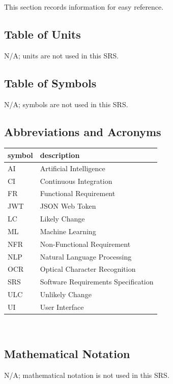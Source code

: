 \documentclass[12pt]{article}
\begin{document}
This section records information for easy reference.

\subsection{Table of Units}

N/A; units are not used in this SRS.

\subsection{Table of Symbols}

N/A; symbols are not used in this SRS.

\subsection{Abbreviations and Acronyms}

\renewcommand{\arraystretch}{1.2}
\begin{tabular}{l l} 
  \toprule		
  \textbf{symbol} & \textbf{description}\\
  \midrule 
  AI & Artificial Intelligence\\
  CI & Continuous Integration\\
  FR & Functional Requirement\\
  JWT & JSON Web Token\\
  LC & Likely Change\\
  ML & Machine Learning\\
  NFR & Non-Functional Requirement\\
  NLP & Natural Language Processing\\
  OCR & Optical Character Recognition\\
  SRS & Software Requirements Specification\\
  ULC & Unlikely Change\\
  UI & User Interface\\
  \bottomrule
\end{tabular}\\

\subsection{Mathematical Notation}

N/A; mathematical notation is not used in this SRS.

\newpage

\end{document}
